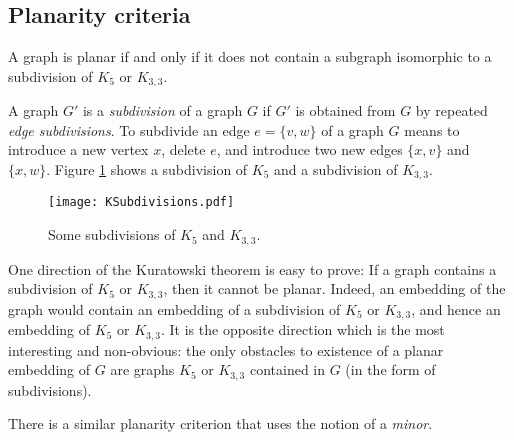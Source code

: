 \begin{page}

\subsection{Planarity criteria}

\end{page}

\begin{page}

\begin{thm}[Kuratowski]
A graph is planar if and only if it does not contain a subgraph isomorphic to a subdivision of $K_5$ or $K_{3,3}$.
\end{thm}

\end{page}

\begin{page}


A graph $G'$ is a \emph{subdivision} of a graph $G$ if $G'$ is obtained from $G$ by repeated \emph{edge subdivisions}.
To subdivide an edge $e = \{v,w\}$ of a graph $G$ means to introduce a new vertex $x$, delete $e$, and introduce two new edges $\{x,v\}$ and $\{x,w\}$.
Figure \ref{fig:KSubdivisions} shows a subdivision of $K_5$ and a subdivision of $K_{3,3}$.

\begin{figure}[ht]
\begin{center}
\texttt{[image: KSubdivisions.pdf]}
\end{center}
\caption{Some subdivisions of $K_5$ and $K_{3,3}$.}
\label{fig:KSubdivisions}
\end{figure}

One direction of the Kuratowski theorem is easy to prove: If a graph contains a subdivision of $K_5$ or $K_{3,3}$, then it cannot be planar.
Indeed, an embedding of the graph would contain an embedding of a subdivision of $K_5$ or $K_{3,3}$,
and hence an embedding of $K_5$ or $K_{3,3}$.
It is the opposite direction which is the most interesting and non-obvious:
the only obstacles to existence of a planar embedding of $G$ are graphs $K_5$ or $K_{3,3}$ contained in $G$ (in the form of subdivisions).


There is a similar planarity criterion that uses the notion of a \emph{minor}.


\end{page}

